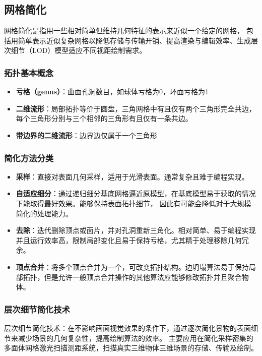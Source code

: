 \documentclass[12pt]{article}
\begin{document}
\subsection{网格简化}

网格简化是指用一些相对简单但维持几何特征的表示来近似一个给定的网格，
包括用简单表示近似复杂网格以降低存储与传输开销、提高渲染与编辑效率、生成层次细节（LOD）模型适应不同视距绘制需求。

\subsubsection{拓扑基本概念}
\begin{itemize}
    \item \textbf{亏格（genus）}：曲面孔洞数目，如球体亏格为0，环面亏格为1
    \item \textbf{二维流形}：局部拓扑等价于圆盘，三角网格中有且仅有两个三角形完全共边，每个三角形分别与三个相邻的三角形有且仅有一条共边。
    \item \textbf{带边界的二维流形}：边界边仅属于一个三角形
\end{itemize}

\subsubsection{简化方法分类}
\begin{itemize}
    \item \textbf{采样}：直接对表面几何采样，适用于光滑表面。通常复杂且难于编程实现。
    \item \textbf{自适应细分}：通过递归细分基底网格逼近原模型，在基底模型易于获取的情况下能取得最好效果。能够保持表面拓扑细节， 因此有可能会降低对于大规模简化的处理能力。
    \item \textbf{去除}：迭代删除顶点或面片，并对孔洞重新三角化。相对简单、易于编程实现并且运行效率高，限制局部变化且易于保持亏格，尤其精于处理移除几何冗余。
    \item \textbf{顶点合并}：将多个顶点合并为一个，可改变拓扑结构。边坍塌算法易于保持局部拓扑，但是允许一般顶点合并操作的其他算法应能够修改拓扑并且聚合物体。
\end{itemize}

\subsubsection{层次细节简化技术}
层次细节简化技术：在不影响画面视觉效果的条件下，通过逐次简化景物的表面细节来减少场景的几何复杂性，提高绘制算法的效率。
主要应用在简化采样密集的多面体网格激光扫描测距系统，扫描真实三维物体三维场景的存储、传输及绘制。
\end{document}

